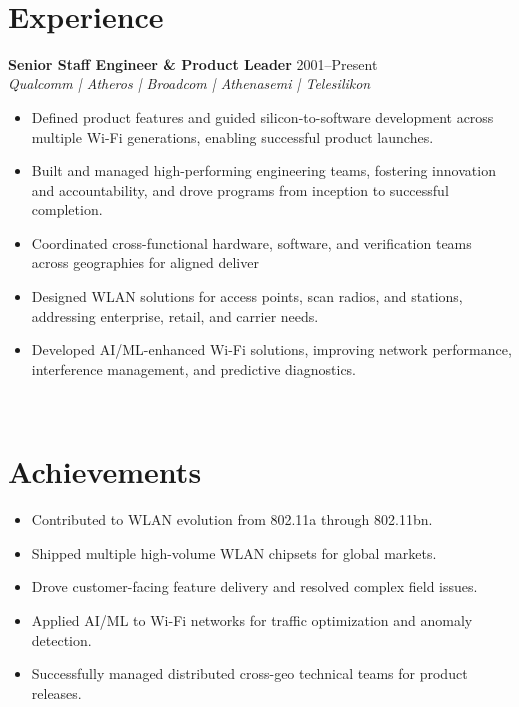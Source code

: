 \documentclass[a4paper,11pt]{article}
\begin{document}
\mbox{} \\

\section*{Experience}
\textbf{Senior Staff Engineer \& Product Leader} \hfill 2001--Present \\
\textit{Qualcomm | Atheros | Broadcom | Athenasemi | Telesilikon} \\
\begin{itemize}
    \item Defined product features and guided silicon-to-software development across multiple Wi-Fi generations, enabling successful product launches.
    \item Built and managed high-performing engineering teams, fostering innovation and accountability, and drove programs from inception to successful completion.
    \item Coordinated cross-functional hardware, software, and verification teams across geographies for aligned deliver
    \item Designed WLAN solutions for access points, scan radios, and stations, addressing enterprise, retail, and carrier needs.
    \item Developed AI/ML-enhanced Wi-Fi solutions, improving network performance, interference management, and predictive diagnostics.
\end{itemize}

\mbox{} \\

\section*{Achievements}
\begin{itemize}
    \item Contributed to WLAN evolution from 802.11a through 802.11bn.
    \item Shipped multiple high-volume WLAN chipsets for global markets.
    \item Drove customer-facing feature delivery and resolved complex field issues.
    \item Applied AI/ML to Wi-Fi networks for traffic optimization and anomaly detection.
    \item Successfully managed distributed cross-geo technical teams for product releases.
\end{itemize}
\end{document}
